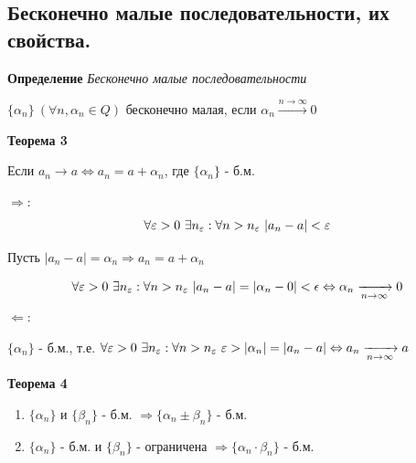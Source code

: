 \subsection{Бесконечно малые последовательности, их свойства.}

\begin{tcolorbox}
\textbf{Определение}
\textit{Бесконечно малые последовательности}
\begin{center}
    $\{\alpha_n\}\ (\forall n, \alpha_n \in Q)$ бесконечно малая, если $\alpha_n 
    \xrightarrow{n\rightarrow \infty} 0$    
\end{center}
\end{tcolorbox}

\begin{tcolorbox}
\textbf{Теорема 3} 
\begin{center}
    Если $a_n \rightarrow a \Leftrightarrow a_n = a + \alpha_n$, где $ \{\alpha_n\}$ - б.м.
\end{center}
\end{tcolorbox}

\begin{tcolorbox}[title=Доказательство Т3]
$\Rightarrow$:\\
\[ \forall \varepsilon>0\ \exists n_\varepsilon : \forall n > n_\varepsilon\ |a_n - a| < \varepsilon \]
\begin{center}
    Пусть $ |a_n-a| = \alpha_n \Rightarrow a_n = a + \alpha_n $    
\end{center}
\[ \forall \varepsilon > 0\ \exists n_\varepsilon: \forall n > n_\varepsilon\  |a_n -a| = |\alpha_n - 0| < \epsilon \Leftrightarrow \alpha_n \xrightarrow[n\rightarrow \infty]{} 0 \]
$\Leftarrow$:\\
\begin{center}
    $ \{\alpha_n \} $ - б.м., т.е. $ \forall \varepsilon>0\ \exists n_\varepsilon : \forall n > n_\varepsilon\ \varepsilon > |\alpha_n| = |a_n-a| \Leftrightarrow a_n \xrightarrow[n \rightarrow \infty]{} a$    
\end{center}
\end{tcolorbox}

\begin{tcolorbox}
\textbf{Теорема 4}
\begin{enumerate}
    \item $\{\alpha_n\}$ и $\{\beta_n\}$ - б.м. $\Rightarrow \{\alpha_n \pm \beta_n\}$ - б.м.
    \item $\{\alpha_n\}$ - б.м. и $\{\beta_n\}$ - ограничена $\Rightarrow \{\alpha_n \cdot \beta_n\}$ - б.м.
\end{enumerate}
\end{tcolorbox}

